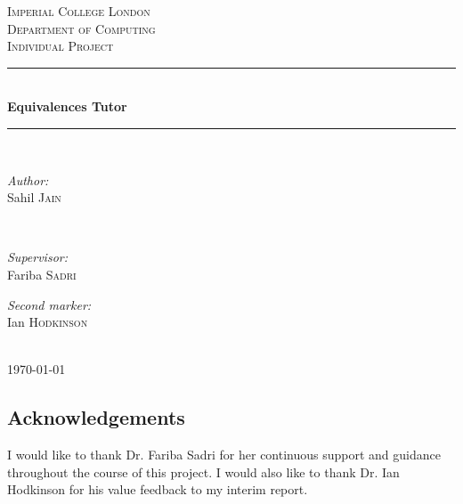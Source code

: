 \documentclass{report}
\begin{document}

\begin{titlepage}
\newcommand{\HRule}{\rule{\linewidth}{0.5mm}}
\center
\textsc{\LARGE Imperial College London} \\[0.5cm]
\textsc{\Large Department of Computing} \\[0.5cm]
\textsc{\large Individual Project} \\[1.5cm]
\HRule \\[0.3cm]
{\huge \bfseries Equivalences Tutor} \\[0.3cm]
\HRule \\[1.5cm]

\begin{minipage}{0.4\textwidth}
\begin{flushleft} \large \emph{Author:} \\
Sahil \textsc{Jain}
\end{flushleft}
\end{minipage}~
\begin{minipage}{0.4\textwidth}
\begin{flushright} \large \emph{Supervisor:} \\
Fariba \textsc{Sadri}
\end{flushright}
\begin{flushright} \large \emph{Second marker:} \\
Ian \textsc{Hodkinson}
\end{flushright}
\end{minipage}\\[4cm]
{\large \today}\\[3cm]
\vfill
\end{titlepage}


\begin{abstract}
\end{abstract}



\subsection*{\centering Acknowledgements}
I would like to thank Dr. Fariba Sadri for her continuous support and guidance
throughout the course of this project. I would also like to thank Dr. Ian
Hodkinson for his value feedback to my interim report.
\end{document}
